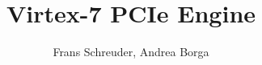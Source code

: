 \author{Frans Schreuder, Andrea Borga}
\title{Virtex-7 PCIe Engine}

\date{\SetDocumentDate}
\def\DocVer{Rev 2.1}
\def\SetDocumentDate{17-04-2015}














